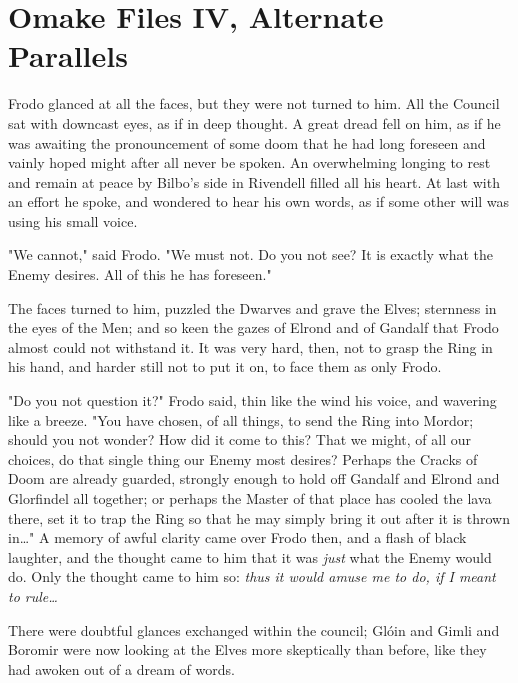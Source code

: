 \chapter{Omake Files IV, Alternate Parallels}


\noindent{}Frodo glanced at all the faces, but they were not turned to him. All the
Council sat with downcast eyes, as if in deep thought. A great dread fell on
him, as if he was awaiting the pronouncement of some doom that he had long
foreseen and vainly hoped might after all never be spoken. An overwhelming
longing to rest and remain at peace by Bilbo's side in Rivendell filled all his
heart. At last with an effort he spoke, and wondered to hear his own words, as
if some other will was using his small voice.

"We cannot," said Frodo. "We must not. Do you not see? It is exactly what the
Enemy desires. All of this he has foreseen."

The faces turned to him, puzzled the Dwarves and grave the Elves; sternness in
the eyes of the Men; and so keen the gazes of Elrond and of Gandalf that Frodo
almost could not withstand it. It was very hard, then, not to grasp the Ring in
his hand, and harder still not to put it on, to face them as only Frodo.

"Do you not question it?" Frodo said, thin like the wind his voice, and
wavering like a breeze. "You have chosen, of all things, to send the Ring into
Mordor; should you not wonder? How did it come to this? That we might, of all
our choices, do that single thing our Enemy most desires? Perhaps the Cracks of
Doom are already guarded, strongly enough to hold off Gandalf and Elrond and
Glorfindel all together; or perhaps the Master of that place has cooled the
lava there, set it to trap the Ring so that he may simply bring it out after it
is thrown in{\ldots}" A memory of awful clarity came over Frodo then, and a
flash of black laughter, and the thought came to him that it was \emph{just}
what the Enemy would do. Only the thought came to him so: \emph{thus it would
amuse me to do, if I meant to rule{\ldots}}

There were doubtful glances exchanged within the council; Glóin and Gimli and
Boromir were now looking at the Elves more skeptically than before, like they
had awoken out of a dream of words.

